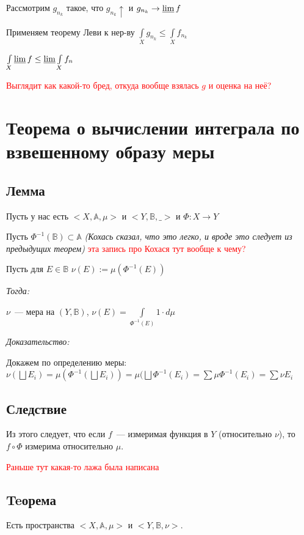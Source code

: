 \documentclass[paper=a4, fontsize=17pt]{article}
\begin{document}
Рассмотрим $ g_{n_k} $ такое, что $ g_{n_k} \uparrow $ и $ g_{n_k} \rightarrow \varliminf f $

Применяем теорему Леви к нер-ву $ \int\limits_{X} g_{n_k} \leq \int\limits_{X} f_{n_k}$

$ \int\limits_{X} \varliminf f \leq \varliminf \int\limits_{X} f_n $

\textcolor{red}{Выглядит как какой-то бред, откуда вообще взялась $g$ и оценка на неё?}

\section{Теорема о вычислении интеграла по взвешенному образу меры}
	\subsection{Лемма}
		Пусть у нас есть $<X, \mathbb{A}, \mu>$ и $<Y, \mathbb{B}, \_>$ и $\Phi: X\rightarrow Y$

		Пусть  $\Phi^{-1}(\mathbb{B}) \subset \mathbb{A}$ \textit{(Кохась сказал, что это легко, и вроде это следует из предыдущих теорем)}
        \textcolor{red}{эта запись про Кохася тут вообще к чему?}

		Пусть для $E \in \mathbb{B}$ $\nu(E):=\mu(\Phi^{-1}(E))$

		\emph{Тогда:}

		 $\nu$~--- мера на $(Y, \mathbb{B})$, $\nu(E) = \int\limits_{\Phi^{-1}(E)} 1 \cdot d\mu$

		\emph{Доказательство:}

			Докажем по определению меры: \\

			$\nu(\bigsqcup E_i) = \mu(\Phi^{-1}(\bigsqcup E_i)) = \mu(\bigsqcup \Phi^{-1}(E_i) = \sum \mu \Phi^{-1}(E_i) = \sum \nu E_i$

	\subsection{Следствие}
	Из этого следует, что если $f$~--- измеримая функция в $Y$ (относительно $\nu$), то $f\circ \Phi$ измерима относительно $\mu$.

    \textcolor{red}{Раньше тут какая-то лажа была написана}

	\subsection {Teорема}
		Есть пространства $<X, \mathbb{A}, \mu>$ и $<Y, \mathbb{B}, \nu>$.
\end{document}
